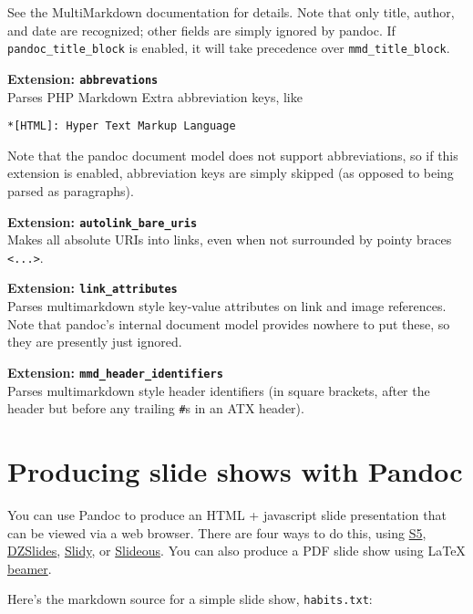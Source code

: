 \documentclass[]{article}
\begin{document}
See the MultiMarkdown documentation for details. Note that only title,
author, and date are recognized; other fields are simply ignored by
pandoc. If \texttt{pandoc\_title\_block} is enabled, it will take
precedence over \texttt{mmd\_title\_block}.

\textbf{Extension: \texttt{abbrevations}}\\Parses PHP Markdown Extra
abbreviation keys, like

\begin{verbatim}
*[HTML]: Hyper Text Markup Language
\end{verbatim}

Note that the pandoc document model does not support abbreviations, so
if this extension is enabled, abbreviation keys are simply skipped (as
opposed to being parsed as paragraphs).

\textbf{Extension: \texttt{autolink\_bare\_uris}}\\Makes all absolute
URIs into links, even when not surrounded by pointy braces
\texttt{\textless{}...\textgreater{}}.

\textbf{Extension: \texttt{link\_attributes}}\\Parses multimarkdown
style key-value attributes on link and image references. Note that
pandoc's internal document model provides nowhere to put these, so they
are presently just ignored.

\textbf{Extension: \texttt{mmd\_header\_identifiers}}\\Parses
multimarkdown style header identifiers (in square brackets, after the
header but before any trailing \texttt{\#}s in an ATX header).

\section{Producing slide shows with Pandoc}

You can use Pandoc to produce an HTML + javascript slide presentation
that can be viewed via a web browser. There are four ways to do this,
using \href{http://meyerweb.com/eric/tools/s5/}{S5},
\href{http://paulrouget.com/dzslides/}{DZSlides},
\href{http://www.w3.org/Talks/Tools/Slidy/}{Slidy}, or
\href{http://goessner.net/articles/slideous/}{Slideous}. You can also
produce a PDF slide show using LaTeX
\href{http://www.tex.ac.uk/CTAN/macros/latex/contrib/beamer}{beamer}.

Here's the markdown source for a simple slide show, \texttt{habits.txt}:
\end{document}
